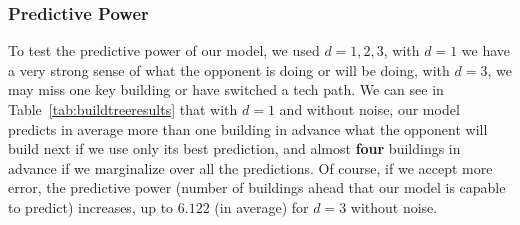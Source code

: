 \subsubsection{Predictive Power}
To test the predictive power of our model, we used $d=1,2,3$, with $d=1$ we have a very strong sense of what the opponent is doing or will be doing, with $d=3$, we may miss one key building or have switched a tech path. We can see in Table~\ref{tab:buildtreeresults} that with $d=1$ and without noise, our model predicts in average more than one building in advance what the opponent will build next if we use only its best prediction, and almost \textbf{four} buildings in advance if we marginalize over all the predictions. Of course, if we accept more error, the predictive power (number of buildings ahead that our model is capable to predict) increases, up to $6.122$ (in average) for $d=3$ without noise.

